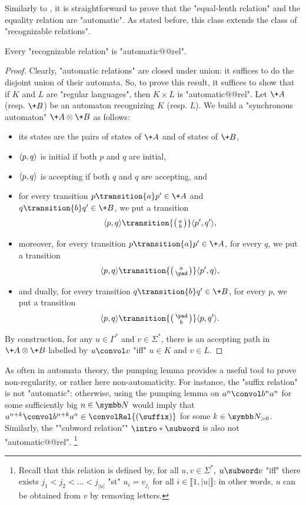 Similarly to ,
it is straightforward to prove that the "equal-lenth relation"
and the equality relation are "automatic". As stated before, this class extends
the class of "recognizable relations".

\begin{proposition}
	Every "recognizable relation" is "automatic@@rel".
\end{proposition}

\begin{proof}
	Clearly, "automatic relations" are closed under union: it suffices to do the disjoint union
	of their automata.
	So, to prove this result, it suffices to show that if $K$ and $L$ are "regular languages",
	then $K \times L$ is "automatic@@rel".
	Let $\+A$ (resp. $\+B$) be an automaton recognizing $K$ (resp. $L$). 
	We build a "synchronous automaton" $\+A \otimes \+B$ as follows:
	\begin{itemize}
		\item its states are the pairs of states of $\+A$ and of states of $\+B$,
		\item $\langle p,q\rangle$ is initial if both $p$ and $q$ are initial,
		\item $\langle p,q\rangle$ is accepting if both $q$ and $q$ are accepting, and
		\item for every transition $p \transition{a} p' \in \+A$ and $q \transition{b} q' \in \+B$,
			we put a transition
			\[
				\tup{p,q} \transition{\pair{a}{b}} \tup{p',q'},
			\]
		\item moreover, for every transition $p \transition{a} p' \in \+A$, for every $q$,
			we put a transition 
			\[\tup{p,q} \transition{\pair{a}{\pad}} \tup{p',q},\]
		\item and dually, for every transition $q \transition{b} q' \in \+B$, for every $p$,
			we put a transition 
			\[\tup{p,q} \transition{\pair{\pad}{b}} \tup{p,q'}.\]
	\end{itemize}
	By construction, for any $u\in \Gamma^*$ and $v\in \Sigma^*$,
	there is an accepting path in $\+A \otimes \+B$ labelled by $u \convol v$ 
	"iff" $u \in K$ and $v\in L$.
\end{proof}

As often in automata theory, the pumping lemma provides a useful tool to prove
non-regularity, or rather here non-automaticity.
For instance, the "suffix relation" is not "automatic": otherwise,
using the pumping lemma on $a^n \convol b^n a^n$ for some sufficiently big $n\in\N$
would imply that $a^{n+k} \convol b^{n+k} a^n \in \convolRel{(\suffix)}$ for some $k\in\Np$.
Similarly, the \AP""subword relation"" $\intro*\subword$ is also not "automatic@@rel".%
\footnote{Recall that this relation is defined by, for all $u, v \in \Sigma^*$,
$u \subword v$ "iff" there exists $j_1 < j_2 < \hdots < j_{|u|}$ "st" $u_i = v_{j_{i}}$
for all $i \in \lBrack 1, |u|\rBrack$: in other words, $u$ can be obtained from $v$ by removing letters.}


